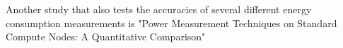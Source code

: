 Another study that also tests the accuracies of several different energy consumption measurements is "Power Measurement Techniques on Standard
Compute Nodes: A Quantitative Comparison" \cite{}